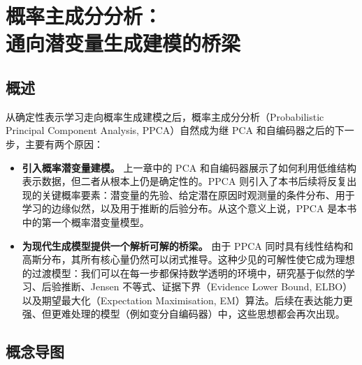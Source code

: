 \chapter[概率主成分分析：通向潜变量生成建模的桥梁]{概率主成分分析：\\通向潜变量生成建模的桥梁}

\section*{概述}

从确定性表示学习走向概率生成建模之后，概率主成分分析（Probabilistic Principal Component Analysis, PPCA）自然成为继 PCA 和自编码器之后的下一步，主要有两个原因：

\begin{itemize}
    \item \textbf{引入概率潜变量建模。}  
    上一章中的 PCA 和自编码器展示了如何利用低维结构表示数据，但二者从根本上仍是确定性的。PPCA 则引入了本书后续将反复出现的关键概率要素：潜变量的先验、给定潜在原因时观测量的条件分布、用于学习的边缘似然，以及用于推断的后验分布。从这个意义上说，PPCA 是本书中的第一个概率潜变量模型。

    \item \textbf{为现代生成模型提供一个解析可解的桥梁。}  
    由于 PPCA 同时具有线性结构和高斯分布，其所有核心量仍然可以闭式推导。这种少见的可解性使它成为理想的过渡模型：我们可以在每一步都保持数学透明的环境中，研究基于似然的学习、后验推断、Jensen 不等式、证据下界（Evidence Lower Bound, ELBO）以及期望最大化（Expectation Maximisation, EM）算法。后续在表达能力更强、但更难处理的模型（例如变分自编码器）中，这些思想都会再次出现。
\end{itemize}

\section*{概念导图}

